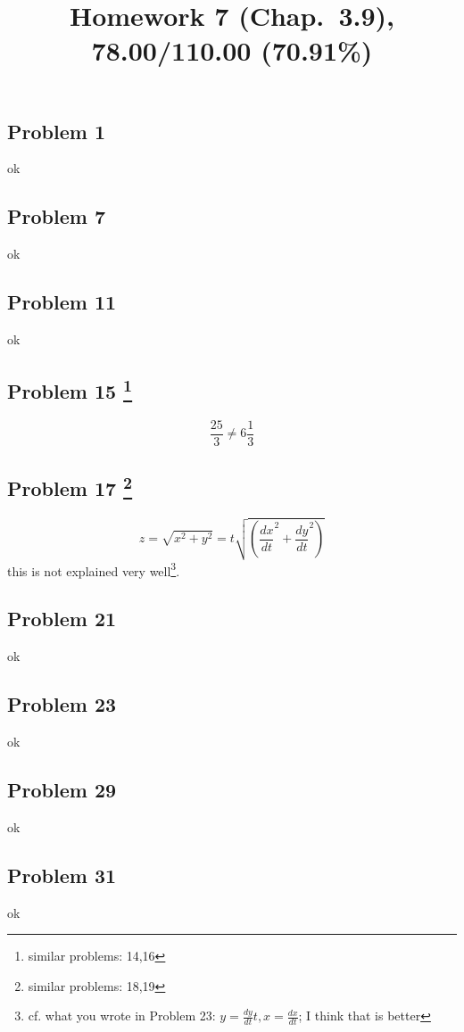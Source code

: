 \documentclass[10pt]{article} %
\title{Homework 7 (Chap.~3.9),
78.00/110.00 (70.91\%)
}
\begin{document}
\maketitle

\subsection*{Problem 1 }
ok
\subsection*{Problem 7 }
ok
\subsection*{Problem 11 }
ok
\subsection*{Problem 15 \footnote{similar problems: 14,16}}
\begin{equation*}
  \frac{25}{3}\neq 6\frac{1}{3}
\end{equation*}
\subsection*{Problem 17 \footnote{similar problems: 18,19}}
\begin{equation*}
  z=\sqrt{x^2+y^2}=t\sqrt{\left( \frac{dx}{dt}^2
  +\frac{dy}{dt}^2\right)}
\end{equation*}
this is not explained very well\footnote{cf. what 
  you wrote in Problem 23: $y=\frac{dy}{dt}t,x=\frac{dx}{dt}$; I think that is better}.
\subsection*{Problem 21 }
ok
\subsection*{Problem 23 }
ok
\subsection*{Problem 29 }
ok
\subsection*{Problem 31 }
ok
\end{document}
